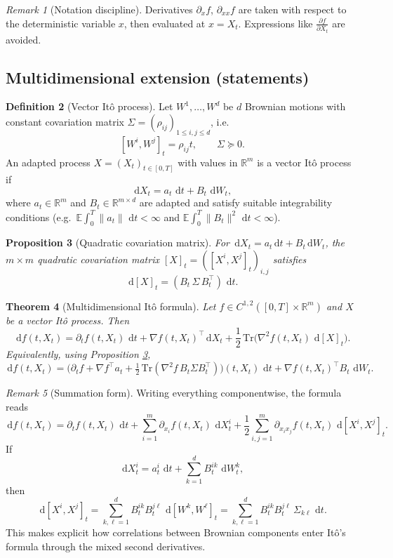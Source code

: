 \documentclass[11pt]{article}
\newcommand{\R}{\mathbb{R}}
\newcommand{\E}{\mathbb{E}}
\newcommand{\dd}{\,\mathrm{d}}
\newcommand{\1}{\mathbf{1}}
\theoremstyle{plain}
\newtheorem{theorem}{Theorem}[section]
\newtheorem{proposition}[theorem]{Proposition}
\theoremstyle{definition}
\newtheorem{definition}[theorem]{Definition}
\theoremstyle{remark}
\newtheorem{remark}[theorem]{Remark}
\begin{document}
\begin{remark}[Notation discipline]
Derivatives $\partial_x f$, $\partial_{xx} f$ are taken with respect to the deterministic variable $x$,
then evaluated at $x=X_t$. Expressions like $\frac{\partial f}{\partial X_t}$ are avoided.
\end{remark}

\subsection{Multidimensional extension (statements)}

\begin{definition}[Vector It\^o process]
Let $W^1,\dots,W^d$ be $d$ Brownian motions with constant covariation matrix
$\Sigma=(\rho_{ij})_{1\le i,j\le d}$, i.e.
\[
[W^i,W^j]_t=\rho_{ij}t,\qquad \Sigma\succeq 0.
\]
An adapted process $X=(X_t)_{t\in[0,T]}$ with values in $\R^m$ is a vector It\^o process if
\[
\dd X_t = a_t\,\dd t + B_t\,\dd W_t,
\]
where $a_t\in\R^m$ and $B_t\in\R^{m\times d}$ are adapted and satisfy suitable integrability conditions
(e.g.\ $\E\int_0^T \|a_t\|\,\dd t<\infty$ and $\E\int_0^T \|B_t\|^2\,\dd t<\infty$).
\end{definition}

\begin{proposition}[Quadratic covariation matrix]\label{prop:qv-matrix}
For $\dd X_t=a_t\dd t+B_t\dd W_t$, the $m\times m$ quadratic covariation matrix
$[X]_t=([X^i,X^j]_t)_{i,j}$ satisfies
\[
\dd[X]_t = (B_t\,\Sigma\,B_t^\top)\,\dd t.
\]
\end{proposition}

\begin{theorem}[Multidimensional It\^o formula]\label{thm:ito-md}
Let $f\in C^{1,2}([0,T]\times\R^m)$ and $X$ be a vector It\^o process. Then
\begin{equation}\label{eq:ito-md}
\dd f(t,X_t)
=
\partial_t f(t,X_t)\,\dd t
+
\nabla f(t,X_t)^\top \dd X_t
+
\frac12\,\mathrm{Tr}\!\Big(\nabla^2 f(t,X_t)\,\dd[X]_t\Big).
\end{equation}
Equivalently, using Proposition \ref{prop:qv-matrix},
\[
\dd f(t,X_t)
=
\Big(
\partial_t f + \nabla f^\top a_t + \tfrac12\,\mathrm{Tr}(\nabla^2 f\,B_t\Sigma B_t^\top)
\Big)(t,X_t)\,\dd t
+
\nabla f(t,X_t)^\top B_t\,\dd W_t.
\]
\end{theorem}

\begin{remark}[Summation form]
Writing everything componentwise, the formula reads
\[
\dd f(t,X_t)
=
\partial_t f(t,X_t)\,\dd t
+
\sum_{i=1}^m \partial_{x_i} f(t,X_t)\,\dd X_t^i
+
\frac12
\sum_{i,j=1}^m
\partial_{x_i x_j} f(t,X_t)\,\dd[X^i,X^j]_t.
\]
If
\[
\dd X_t^i = a_t^i\,\dd t + \sum_{k=1}^d B_t^{ik}\,\dd W_t^k,
\]
then
\[
\dd[X^i,X^j]_t
=
\sum_{k,\ell=1}^d
B_t^{ik} B_t^{j\ell}\,\dd[W^k,W^\ell]_t
=
\sum_{k,\ell=1}^d
B_t^{ik} B_t^{j\ell}\,\Sigma_{k\ell}\,\dd t.
\]
This makes explicit how correlations between Brownian components enter It\^o's formula
through the mixed second derivatives.
\end{remark}
\end{document}
